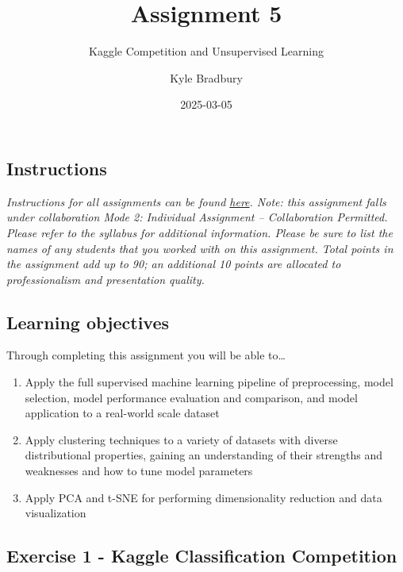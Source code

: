 \documentclass[
  letterpaper,
  DIV=11,
  numbers=noendperiod]{scrartcl}
\title{Assignment 5}
\subtitle{Kaggle Competition and Unsupervised Learning}
\author{Kyle Bradbury}
\date{2025-03-05}
\providecommand{\tightlist}{%
  \setlength{\itemsep}{0pt}\setlength{\parskip}{0pt}}\usepackage{longtable,booktabs,array}
\renewcommand*\contentsname{Table of contents}
\newcommand\contentsname{Table of contents}
\begin{document}
\maketitle

\renewcommand*\contentsname{Table of contents}
{
\hypersetup{linkcolor=}
\setcounter{tocdepth}{1}
\tableofcontents
}

\subsection{Instructions}\label{instructions}

\emph{Instructions for all assignments can be found
\href{https://kylebradbury.github.io/ids705/notebooks/assignment_instructions.html}{here}.
Note: this assignment falls under collaboration Mode 2: Individual
Assignment -- Collaboration Permitted. Please refer to the syllabus for
additional information. Please be sure to list the names of any students
that you worked with on this assignment. Total points in the assignment
add up to 90; an additional 10 points are allocated to professionalism
and presentation quality.}

\subsection{Learning objectives}\label{learning-objectives}

Through completing this assignment you will be able to\ldots{}

\begin{enumerate}
\def\labelenumi{\arabic{enumi}.}
\tightlist
\item
  Apply the full supervised machine learning pipeline of preprocessing,
  model selection, model performance evaluation and comparison, and
  model application to a real-world scale dataset
\item
  Apply clustering techniques to a variety of datasets with diverse
  distributional properties, gaining an understanding of their strengths
  and weaknesses and how to tune model parameters
\item
  Apply PCA and t-SNE for performing dimensionality reduction and data
  visualization
\end{enumerate}

\subsection{Exercise 1 - Kaggle Classification
Competition}\label{exercise-1---kaggle-classification-competition}
\end{document}
